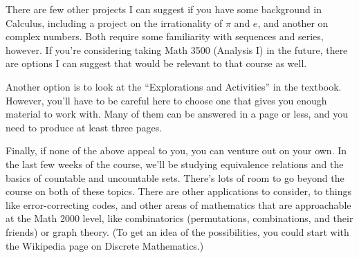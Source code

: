 \documentclass[letterpaper,12pt]{article}
\begin{document}
There are few other projects I can suggest if you have some background in Calculus, including a project on the irrationality of $\pi$ and $e$, and another on complex numbers. Both require some familiarity with sequences and series, however. If you're considering taking Math 3500 (Analysis I) in the future, there are options I can suggest that would be relevant to that course as well.

\bigskip

Another option is to look at the ``Explorations and Activities'' in the textbook. However, you'll have to be careful here to choose one that gives you enough material to work with. Many of them can be answered in a page or less, and you need to produce at least three pages.

\bigskip

Finally, if none of the above appeal to you, you can venture out on your own. In the last few weeks of the course, we'll be studying equivalence relations and the basics of countable and uncountable sets. There's lots of room to go beyond the course on both of these topics. There are other applications to consider, to things like error-correcting codes, and other areas of mathematics that are approachable at the Math 2000 level, like combinatorics (permutations, combinations, and their friends) or graph theory. (To get an idea of the possibilities, you could start with the Wikipedia page on Discrete Mathematics.)
\end{document}
